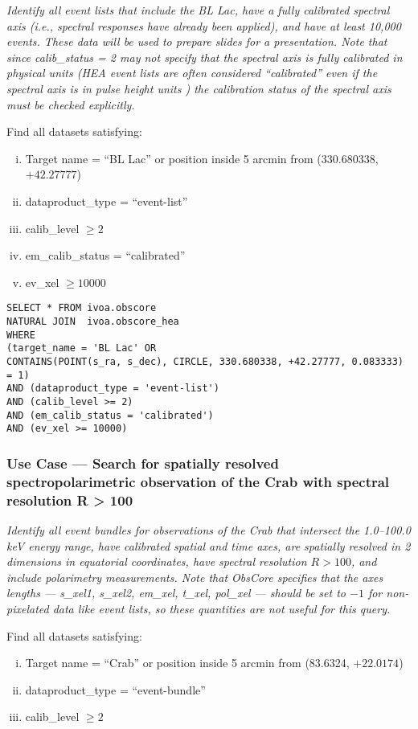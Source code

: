 {\em Identify all event lists that include the BL Lac, have a fully calibrated spectral axis (i.e., spectral responses have already been applied), and have at least 10,000 events.  These data will be used to prepare slides for a presentation.  Note that since calib\_status = 2 may not specify that the spectral axis is fully calibrated in physical units (HEA event lists are often considered ``calibrated'' even if the spectral axis is in pulse height units ) the calibration status of the spectral axis must be checked explicitly.\/}

\medskip
\noindent Find all datasets satisfying:
\begin{enumerate}[(i)]
  \item Target name = ``BL Lac'' or position inside 5 arcmin from (330.680338, $+42.27777$)
  \item dataproduct\_type = ``event-list''
  \item calib\_level $\geq 2$
  \item em\_calib\_status = ``calibrated''
  \item ev\_xel $\geq 10000$
\end{enumerate}

\begin{verbatim}
SELECT * FROM ivoa.obscore
NATURAL JOIN  ivoa.obscore_hea
WHERE
(target_name = 'BL Lac' OR
CONTAINS(POINT(s_ra, s_dec), CIRCLE, 330.680338, +42.27777, 0.083333) = 1)
AND (dataproduct_type = 'event-list')
AND (calib_level >= 2)
AND (em_calib_status = 'calibrated')
AND (ev_xel >= 10000)
\end{verbatim}


\subsubsection{Use Case --- Search for spatially resolved spectropolarimetric observation of the Crab with spectral resolution R > 100}

{\em Identify all event bundles for observations of the Crab that intersect the 1.0--100.0 keV energy range, have calibrated spatial and time axes, are spatially resolved in 2 dimensions in equatorial coordinates, have spectral resolution $R>100$, and include polarimetry measurements.  Note that ObsCore specifies that the axes lengths --- s\_xel1, s\_xel2, em\_xel, t\_xel, pol\_xel --- should be set to $-1$ for non-pixelated data like event lists, so these quantities are not useful for this query.\/}

\medskip
\noindent Find all datasets satisfying:
\begin{enumerate}[(i)]
  \item Target name = ``Crab'' or position inside 5 arcmin from (83.6324, $+22.0174$)
  \item dataproduct\_type = ``event-bundle''
  \item calib\_level $\geq 2$
\end{enumerate}

